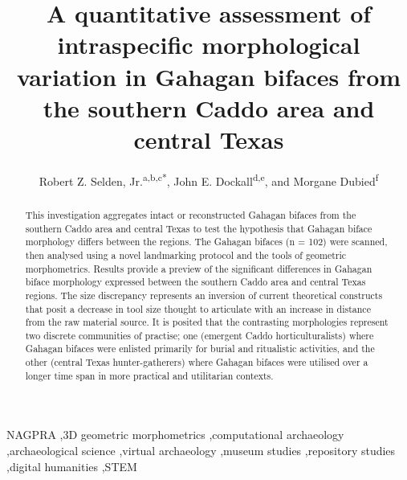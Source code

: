 \documentclass[review]{elsarticle}
\begin{document}
\begin{frontmatter}


\title{A quantitative assessment of intraspecific morphological variation in Gahagan bifaces from the southern Caddo area and central Texas}

\author{Robert Z. Selden, Jr.\textsuperscript{a,b,c*}, John E. Dockall\textsuperscript{d,e}, and Morgane Dubied\textsuperscript{f}}
\address[1]{Heritage Research Center, Stephen F. Austin State University, United States}
\address[2]{Cultural Heritage Department, Jean Monnet University, France}
\address[3]{ORCID ID \href{http://orcid.org/0000-0002-1789-8449}{0000-0002-1789-8449}}
\address[4]{Cox|McLain Environmental Consulting, Inc., United States}
\address[5]{ORCID ID \href{http://orcid.org/0000-0002-0940-7144}{0000-0002-0940-7144}}
\address[6]{UMR 6282, Laboratoire Biogéosciences, Université de Bourgogne, France}

\begin{abstract}
This investigation aggregates intact or reconstructed Gahagan bifaces from the southern Caddo area and central Texas to test the hypothesis that Gahagan biface morphology differs between the regions. The Gahagan bifaces (n = 102) were scanned, then analysed using a novel landmarking protocol and the tools of geometric morphometrics. Results provide a preview of the significant differences in Gahagan biface morphology expressed between the southern Caddo area and central Texas regions. The size discrepancy represents an inversion of current theoretical constructs that posit a decrease in tool size thought to articulate with an increase in distance from the raw material source. It is posited that the contrasting morphologies represent two discrete communities of practise; one (emergent Caddo horticulturalists) where Gahagan bifaces were enlisted primarily for burial and ritualistic activities, and the other  (central Texas hunter-gatherers) where Gahagan bifaces were utilised over a longer time span in more practical and utilitarian contexts.
\end{abstract}

\begin{keyword}
NAGPRA \sep 3D geometric morphometrics \sep computational archaeology \sep archaeological science \sep virtual archaeology \sep museum studies \sep repository studies \sep digital humanities \sep STEM
\end{keyword}

\end{frontmatter}
\end{document}
